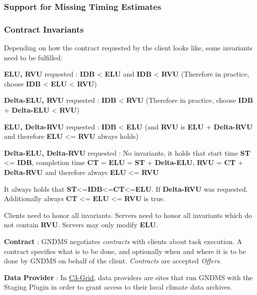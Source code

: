 \documentclass{article}
\begin{document}
\subsubsection{Support for Missing Timing Estimates}

\subsubsection{Contract Invariants}

Depending on how the contract requested by the client looks like,
some invariants need to be fulfilled:

\textbf{ELU, RVU} requested : \textbf{IDB} \textless{} \textbf{ELU}
and \textbf{IDB} \textless{} \textbf{RVU} (Therefore in practice,
choose \textbf{IDB} \textless{} \textbf{ELU} \textless{}
\textbf{RVU})

\textbf{Delta-ELU, RVU} requested : \textbf{IDB} \textless{}
\textbf{RVU} (Therefore in practice, choose \textbf{IDB} +
\textbf{Delta-ELU} \textless{} \textbf{RVU})

\textbf{ELU, Delta-RVU} requested : \textbf{IDB} \textless{}
\textbf{ELU} (and \textbf{RVU} is \textbf{ELU} + \textbf{Delta-RVU}
and therefore \textbf{ELU} \textless{}= \textbf{RVU} always holds)

\textbf{Delta-ELU, Delta-RVU} requested : No invariants, it holds
that start time \textbf{ST} \textless{}= \textbf{IDB}, completion
time \textbf{CT} = \textbf{ELU} = \textbf{ST} + \textbf{Delta-ELU},
\textbf{RVU} = \textbf{CT} + \textbf{Delta-RVU} and therefore
always \textbf{ELU} \textless{}= \textbf{RVU}

It always holds that
\textbf{ST}\textless{}=\textbf{IDB}\textless{}=\textbf{CT}\textless{}=\textbf{ELU}.
If \textbf{Delta-RVU} was requested. Additionally always
\textbf{CT} \textless{}= \textbf{ELU} \textless{}= \textbf{RVU} is
true.

Clients need to honor all invariants. Servers need to honor all
invariants which do not contain \textbf{RVU}. Servers may only
modify \textbf{ELU}.

\textbf{Contract} : GNDMS negotiates \emph{contracts} with clients
about task execution. A contract specifies what is to be done, and
optionally when and where it is to be done by GNDMS on behalf of
the client. \emph{Contracts} are accepted \emph{Offers}.

\textbf{Data Provider} : In \href{http://www.c3grid.de}{C3-Grid},
data providers are sites that run GNDMS with the Staging Plugin in
order to grant access to their local climate data archives.
\end{document}

